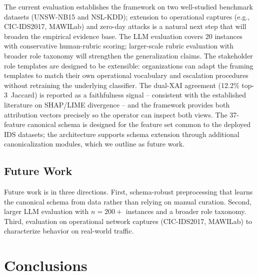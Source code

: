 \documentclass[sensors,apajournal,article,submit,moreauthors]{Definitions/mdpi}
\begin{document}
The current evaluation establishes the framework on two well-studied benchmark datasets (UNSW-NB15 and NSL-KDD); extension to operational captures (e.g., CIC-IDS2017, MAWILab) and zero-day attacks is a natural next step that will broaden the empirical evidence base. The LLM evaluation covers 20 instances with conservative human-rubric scoring; larger-scale rubric evaluation with broader role taxonomy will strengthen the generalization claims. The stakeholder role templates are designed to be extensible: organizations can adapt the framing templates to match their own operational \mbox{vocabulary} and escalation procedures without retraining the underlying classifier. The dual-XAI agreement (12.2\% \mbox{top-3 Jaccard}) is reported as a faithfulness signal -- consistent with the established literature on SHAP/LIME divergence -- and the framework provides both attribution vectors precisely so the operator can inspect both views. The 37-feature canonical schema is designed for the feature set common to the deployed IDS datasets; the architecture supports schema extension through additional canonicalization modules, which we outline as future work.

\subsection{Future Work}

Future work is in three directions. First, schema-robust preprocessing that learns the canonical schema from data rather than relying on manual curation. Second, larger LLM evaluation with $n=200+$ instances and a broader role taxonomy. Third, evaluation on operational network captures (CIC-IDS2017, MAWILab) to characterize behavior on \mbox{real-world} traffic.

\section{Conclusions}
\end{document}
